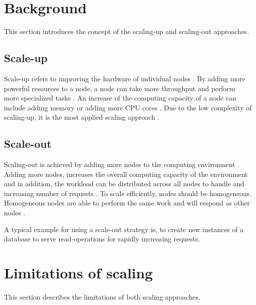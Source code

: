 \documentclass{article}
\begin{document}
\section{Background}

This section introduces the concept of the scaling-up and scaling-out approaches.

\subsection{Scale-up}
Scale-up refers to improving the hardware of individual nodes \cite{Wilder2012CloudPatterns}. By adding more powerful resources to a node, a node can take more throughput and perform more specialized tasks \cite{Abbott2015ScalabilityArt}.
An increase of the computing capacity of a node can include adding memory or adding more CPU cores \cite{Wilder2012CloudPatterns}.
Due to the low complexity of scaling-up, it is the most applied scaling approach \cite{Wilder2012CloudPatterns}.


\subsection{Scale-out}
Scaling-out is achieved by adding more nodes to the computing environment \cite{Wilder2012CloudPatterns}. Adding more nodes, increases the overall computing capacity of the environment and in addition, the workload can be distributed across all nodes to handle and increasing number of requests \cite{Wilder2012CloudPatterns, Abbott2015ScalabilityArt}.
To scale efficiently, nodes should be homogeneous. Homogeneous nodes are able to perform the same work and will respond as other nodes \cite{Abbott2015ScalabilityArt}.


A typical example for using a scale-out strategy is, to create new instances of a database to serve read-operations for rapidly increasing requests.


\section{Limitations of scaling}
\paragraph{}
This section describes the limitations of both scaling approaches.
\end{document}
